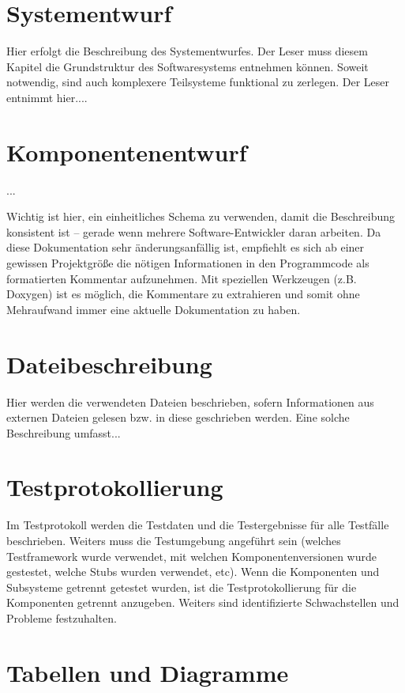 \section{Systementwurf}

Hier erfolgt die Beschreibung des Systementwurfes. Der Leser muss diesem Kapitel
die Grundstruktur des Softwaresystems entnehmen können. Soweit notwendig, sind
auch komplexere Teilsysteme funktional zu zerlegen.
Der Leser entnimmt hier....


\section{Komponentenentwurf}

...

Wichtig ist hier, ein einheitliches Schema zu verwenden, damit die Beschreibung konsistent ist – gerade wenn mehrere Software-Entwickler daran arbeiten.
Da diese Dokumentation sehr änderungsanfällig ist, empfiehlt es sich ab einer gewissen Projektgröße die nötigen Informationen in den Programmcode als formatierten
Kommentar aufzunehmen. Mit speziellen Werkzeugen (z.B. Doxygen) ist es möglich,
die Kommentare zu extrahieren und somit ohne Mehraufwand immer eine aktuelle
Dokumentation zu haben.


\section{Dateibeschreibung}

Hier werden die verwendeten Dateien beschrieben, sofern Informationen aus externen
Dateien gelesen bzw. in diese geschrieben werden. Eine solche Beschreibung umfasst...

\section{Testprotokollierung}

Im Testprotokoll werden die Testdaten und die Testergebnisse für alle Testfälle beschrieben. Weiters muss die Testumgebung angeführt sein (welches Testframework
wurde verwendet, mit welchen Komponentenversionen wurde gestestet, welche Stubs
wurden verwendet, etc). Wenn die Komponenten und Subsysteme getrennt getestet
wurden, ist die Testprotokollierung für die Komponenten getrennt anzugeben. Weiters sind identifizierte Schwachstellen und Probleme festzuhalten.

\section{Tabellen und Diagramme}

